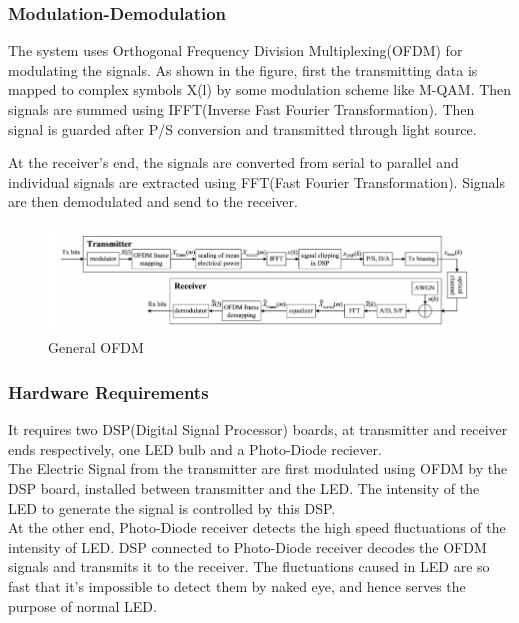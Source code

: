 \documentclass{article}
\begin{document}
\subsubsection{Modulation-Demodulation}

{The system uses Orthogonal Frequency Division Multiplexing(OFDM) for modulating the signals. As shown in the figure, first the transmitting data is mapped to complex symbols X(l) by some modulation scheme like M-QAM. 
Then signals are summed using IFFT(Inverse Fast Fourier Transformation). 
Then signal is guarded after P/S conversion and transmitted through light source.\\{\cite{gen-ofdm}}}


{At the receiver's end, the signals are converted from serial to parallel and individual signals are extracted using FFT(Fast Fourier Transformation). Signals are then demodulated and send to the receiver.{\cite{gen-ofdm}}}



\begin{figure}[!h]
  \includegraphics[width=\linewidth]{res/OFDM_li_fi.PNG}
    \caption{General OFDM{\cite{gen-ofdm}}}
  \label{fig:OFDM_li_fi}
\end{figure}


\subsubsection{Hardware Requirements}

{It requires two DSP(Digital Signal Processor) boards, at transmitter and receiver ends respectively, one LED bulb and a Photo-Diode reciever.\\
The Electric Signal from the transmitter are first modulated using OFDM by the DSP board, installed between transmitter and the LED. 
The intensity of the LED to generate the signal is controlled by this DSP.{\cite{hardware}}}\\


{At the other end, Photo-Diode receiver detects the high speed fluctuations of the intensity of LED. DSP connected to Photo-Diode receiver decodes the OFDM signals and transmits it to the receiver.
The fluctuations caused in LED are so fast that it's impossible to detect them by naked eye, and hence serves the purpose of normal LED.{\cite{hardware}}}
\end{document}
